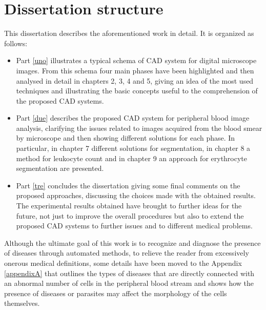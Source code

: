 \documentclass[final,a4paper,12pt,english]{UnicaPhdThesis3}
\begin{document}
\section{Dissertation structure} 
This dissertation describes the aforementioned work in detail. It is organized as follows:
\begin{itemize}
\item Part \ref{uno} illustrates a typical schema of CAD system for digital microscope images. From this schema four main phases have been highlighted and then analysed in detail in chapters 2, 3, 4 and 5, giving an idea of the most used techniques and illustrating the basic concepts useful to the comprehension of the proposed CAD systems. 

\item Part \ref{due} describes the proposed CAD system for peripheral blood image analysis, clarifying the issues related to images acquired from the blood smear by microscope and then showing different solutions for each phase. In particular, in chapter 7 different solutions for segmentation, in chapter 8 a method for leukocyte count and in chapter 9 an approach for erythrocyte segmentation are presented.
 
\item Part \ref{tre} concludes the dissertation giving some final comments on the proposed approaches, discussing the choices made with the obtained results. The experimental results obtained have brought to further ideas for the future, not just to improve the overall procedures but also to extend the proposed CAD systems to further issues and to different medical problems. 
\end{itemize}
Although the ultimate goal of this work is to recognize and diagnose the presence of diseases through automated methods, to relieve the reader from excessively onerous medical definitions, some details have been moved to the Appendix \ref{appendixA} that outlines the types of diseases that are directly connected with an abnormal number of cells in the peripheral blood stream and shows how the presence of diseases or parasites may affect the morphology of the cells themselves.
\end{document}
